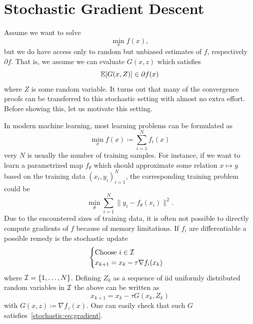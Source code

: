 \chapter{Stochastic Gradient Descent}
Assume we want to solve
\begin{equation}
    \min_x f(x),
\end{equation}
but we do have access only to random but unbiased estimates of $f$, respectively $\partial f$. That is, we assume we can evaluate $G(x,z)$ which satisfies
\begin{equation}\label{stochastic:eq:gradient}
    \mathbb{E}[G(x,Z)] \in \partial f(x)
\end{equation}
where $Z$ is some random variable.
It turns out that many of the convergence proofs can be transferred to this stochastic setting with almost no extra effort. Before showing this, let us motivate this setting.

In modern machine learning, most learning problems can be formulated as
\begin{equation}
    \min_x f(x)\coloneqq \sum_{i=1}^N f_i(x)
\end{equation}
very $N$ is usually the number of training samples. For instance, if we want to learn a parametrized map $f_\theta$ which should approximate some relation $x\mapsto y$ based on the training data $(x_i,y_i)_{i=1}^N$, the corresponding training problem could be
\begin{equation}
    \min_\theta \sum_{i=1}^N \|y_i-f_\theta(x_i)\|^2.
\end{equation}
Due to the encountered sizes of training data, it is often not possible to directly compute gradients of $f$ because of memory limitations.
If $f_i$ are differentiable a possible remedy is the stochastic update
\begin{equation}
    \begin{cases}
        \text{Choose $i\in\mathcal{I}$}\\
        x_{k+1} = x_k - \tau \nabla f_i(x_k)
    \end{cases}
\end{equation}
where $\mathcal{I}=\{1,\dots,N\}$.
Defining $Z_k$ as a sequence of iid uniformly distributed random variables in $\mathcal{I}$ the above can be written as
\begin{equation}
    x_{k+1} = x_k - \tau G(x_k,Z_k)
\end{equation}
with $G(x,z) \coloneqq \nabla f_z(x)$. One can easily check that such $G$ satisfies~\eqref{stochastic:eq:gradient}.

